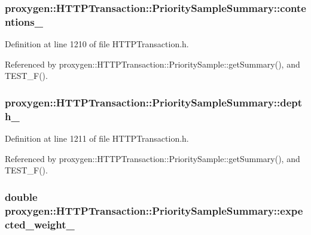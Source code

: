 \subsubsection[{contentions\+\_\+}]{ proxygen\+::\+H\+T\+T\+P\+Transaction\+::\+Priority\+Sample\+Summary\+::contentions\+\_\+}\label{structproxygen_1_1HTTPTransaction_1_1PrioritySampleSummary_a9f9f9c9c297aba9e43494a7dfd4254c8}


Definition at line 1210 of file H\+T\+T\+P\+Transaction.\+h.



Referenced by proxygen\+::\+H\+T\+T\+P\+Transaction\+::\+Priority\+Sample\+::get\+Summary(), and T\+E\+S\+T\+\_\+\+F().

\subsubsection[{depth\+\_\+}]{ proxygen\+::\+H\+T\+T\+P\+Transaction\+::\+Priority\+Sample\+Summary\+::depth\+\_\+}\label{structproxygen_1_1HTTPTransaction_1_1PrioritySampleSummary_ae7a6f6c9d399caa7f9f822d9f9978c29}


Definition at line 1211 of file H\+T\+T\+P\+Transaction.\+h.



Referenced by proxygen\+::\+H\+T\+T\+P\+Transaction\+::\+Priority\+Sample\+::get\+Summary(), and T\+E\+S\+T\+\_\+\+F().

\subsubsection[{expected\+\_\+weight\+\_\+}]{\setlength{\rightskip}{0pt plus 5cm}double proxygen\+::\+H\+T\+T\+P\+Transaction\+::\+Priority\+Sample\+Summary\+::expected\+\_\+weight\+\_\+}\label{structproxygen_1_1HTTPTransaction_1_1PrioritySampleSummary_a861167815a7cdbba5d0d65cd6f6b9b74}


